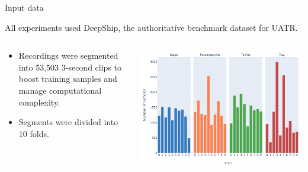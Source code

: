 \documentclass[]{beamer}
\begin{document}
\begin{frame}{Input data}

    All experiments used DeepShip, the authoritative benchmark dataset for UATR. 

    \vspace{0.25cm}
    
    \begin{columns}
        \begin{column}{0.35\textwidth}
            \begin{itemize}
                \item Recordings were segmented into 53,503 3-second clips to boost training samples and manage computational complexity.
                \item Segments were divided into 10 folds.
            \end{itemize}
        \end{column}

        \begin{column}{0.65\textwidth}
            \centering
            \includegraphics[width=\linewidth]{img/10_class_counts_facet.pdf}
        \end{column}
    \end{columns}

\end{frame}
\end{document}
